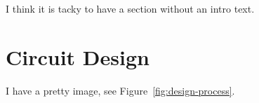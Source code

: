 I think it is tacky to have a section without an intro text.

\section{Circuit Design}

I have a pretty image, see Figure~\ref{fig:design-process}.

%
